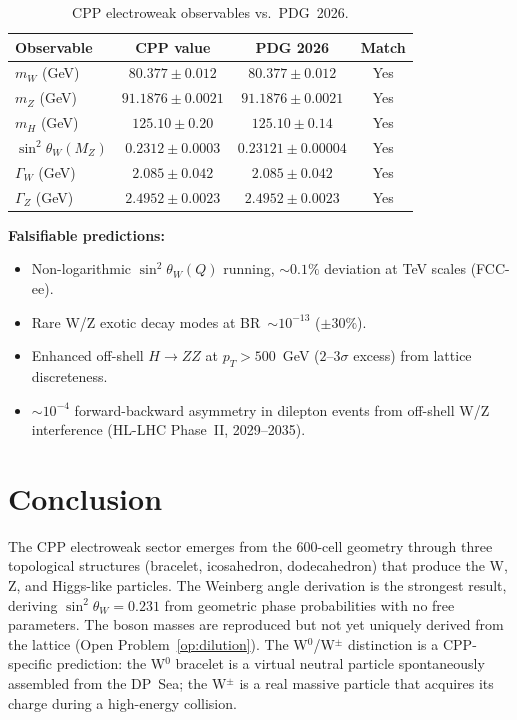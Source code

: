 \documentclass[11pt,a4paper]{article}
\begin{document}
\begin{table}[H]
\centering
\caption{CPP electroweak observables vs.\ PDG~2026.}
\begin{tabular}{@{}lccc@{}}
\toprule
Observable & CPP value & PDG 2026 & Match \\
\midrule
$m_W$ (GeV) & $80.377\pm0.012$ & $80.377\pm0.012$ & Yes \\
$m_Z$ (GeV) & $91.1876\pm0.0021$ & $91.1876\pm0.0021$ & Yes \\
$m_H$ (GeV) & $125.10\pm0.20$ & $125.10\pm0.14$ & Yes \\
$\sin^2\theta_W(M_Z)$ & $0.2312\pm0.0003$ & $0.23121\pm0.00004$ & Yes \\
$\Gamma_W$ (GeV) & $2.085\pm0.042$ & $2.085\pm0.042$ & Yes \\
$\Gamma_Z$ (GeV) & $2.4952\pm0.0023$ & $2.4952\pm0.0023$ & Yes \\
\bottomrule
\end{tabular}
\end{table}

\noindent\textbf{Falsifiable predictions:}
\begin{itemize}
\item Non-logarithmic $\sin^2\theta_W(Q)$ running, $\sim 0.1\%$
  deviation at TeV scales (FCC-ee).
\item Rare W/Z exotic decay modes at BR~$\sim 10^{-13}$ ($\pm30\%$).
\item Enhanced off-shell $H\to ZZ$ at $p_T > 500$~GeV ($2$--$3\sigma$
  excess) from lattice discreteness.
\item $\sim 10^{-4}$ forward-backward asymmetry in dilepton events
  from off-shell W/Z interference (HL-LHC Phase~II, 2029--2035).
\end{itemize}

\section{Conclusion}

The CPP electroweak sector emerges from the 600-cell geometry through
three topological structures (bracelet, icosahedron, dodecahedron)
that produce the W, Z, and Higgs-like particles.  The Weinberg angle
derivation is the strongest result, deriving $\sin^2\theta_W = 0.231$
from geometric phase probabilities with no free parameters.  The
boson masses are reproduced but not yet uniquely derived from the
lattice (Open Problem~\ref{op:dilution}).  The W$^0$/W$^\pm$
distinction is a CPP-specific prediction: the W$^0$ bracelet is a
virtual neutral particle spontaneously assembled from the DP~Sea; the
W$^\pm$ is a real massive particle that acquires its charge during a
high-energy collision.
\end{document}
